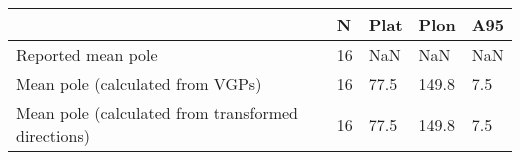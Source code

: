 \begin{tabular}{lllll}
\toprule
{} &   N &  Plat &   Plon &  A95 \\
\midrule
Reported mean pole                                 &  16 &   NaN &    NaN &  NaN \\
Mean pole (calculated from VGPs)                   &  16 &  77.5 &  149.8 &  7.5 \\
Mean pole (calculated from transformed directions) &  16 &  77.5 &  149.8 &  7.5 \\
\bottomrule
\end{tabular}
